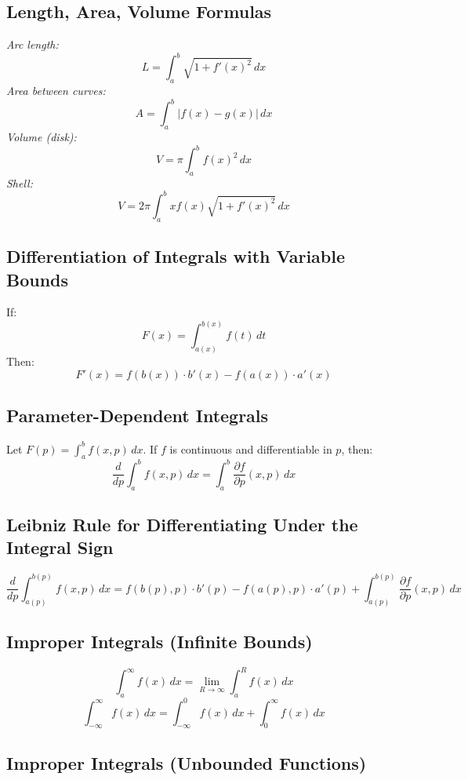 \subsection{Length, Area, Volume Formulas}

\emph{Arc length:}
\[
L = \int_a^b \sqrt{1 + {f'(x)}^2}\,dx
\]
\emph{Area between curves:}
\[
A = \int_a^b |f(x) - g(x)|\,dx
\]
\emph{Volume (disk):}
\[
V = \pi \int_a^b {f(x)}^2\,dx
\]
\emph{Shell:}
\[
V = 2\pi \int_a^b x f(x) \sqrt{1 + {f'(x)}^2}\,dx
\]

\subsection{Differentiation of Integrals with Variable Bounds}

If:
\[
F(x) = \int_{a(x)}^{b(x)} f(t)\,dt
\]
Then:
\[
F'(x) = f(b(x)) \cdot b'(x) - f(a(x)) \cdot a'(x)
\]

\subsection{Parameter-Dependent Integrals}

Let \(F(p) = \int_a^b f(x, p)\,dx\). If \(f\) is continuous and differentiable in \(p\), then:
\[
\frac{d}{dp} \int_a^b f(x, p)\,dx = \int_a^b \frac{\partial f}{\partial p}(x, p)\,dx
\]

\subsection{Leibniz Rule for Differentiating Under the Integral Sign}

\[
\frac{d}{dp} \int_{a(p)}^{b(p)} f(x, p)\,dx = f(b(p), p) \cdot b'(p) - f(a(p), p) \cdot a'(p) + \int_{a(p)}^{b(p)} \frac{\partial f}{\partial p}(x, p)\,dx
\]

\subsection{Improper Integrals (Infinite Bounds)}

\[
\int_a^\infty f(x)\,dx = \lim_{R \to \infty} \int_a^R f(x)\,dx
\]
\[
\int_{-\infty}^\infty f(x)\,dx = \int_{-\infty}^0 f(x)\,dx + \int_0^\infty f(x)\,dx
\]

\subsection{Improper Integrals (Unbounded Functions)}

